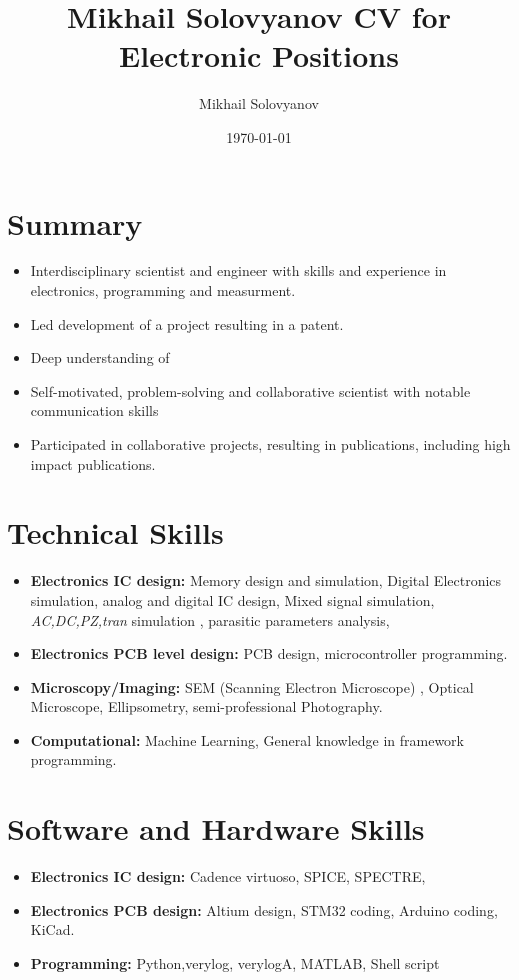 \documentclass{article}
\title{ Mikhail Solovyanov CV for Electronic Positions}
\author{Mikhail Solovyanov}
\date{\today}
\begin{document}

\makecvtitle %

\section{Summary}
\begin{itemize}
\item Interdisciplinary scientist and engineer  with skills and experience in electronics, programming and measurment. 

\item Led development of a  project resulting in a patent.
\item Deep understanding of 
\item Self-motivated, problem-solving and collaborative scientist with notable communication skills

\item Participated in collaborative projects, resulting in publications, including high impact publications.
\end{itemize}
 
\section{Technical Skills}

\begin{itemize}
\item \textbf{Electronics IC design:} Memory design and simulation, Digital Electronics simulation, analog and digital IC design, Mixed signal simulation, \textit{AC,DC,PZ,tran} simulation , parasitic parameters analysis, 
\item \textbf{Electronics PCB level design:} PCB design, microcontroller programming. 
\item \textbf{Microscopy/Imaging:} SEM (Scanning Electron Microscope) , Optical Microscope, Ellipsometry, semi-professional Photography.
\item \textbf{Computational:} Machine Learning, General knowledge in framework programming.
\end{itemize}

\section{Software and Hardware Skills} 
\begin{itemize}
\item \textbf{Electronics IC design:} Cadence virtuoso, SPICE, SPECTRE, 
\item \textbf{Electronics PCB design:} Altium design, STM32 coding, Arduino coding, KiCad.
\item \textbf{Programming:} Python,verylog, verylogA, MATLAB, Shell script
\end{itemize}
 
\end{document}
